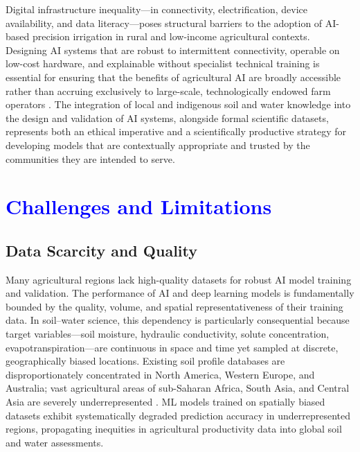 \documentclass[land,article,submit,pdftex,moreauthors]{Definitions/mdpi}
\numberwithin{equation}{section}
\begin{document}
Digital infrastructure inequality---in connectivity, electrification, device availability, and data literacy---poses structural barriers to the adoption of AI-based precision irrigation in rural and low-income agricultural contexts. Designing AI systems that are robust to intermittent connectivity, operable on low-cost hardware, and explainable without specialist technical training is essential for ensuring that the benefits of agricultural AI are broadly accessible rather than accruing exclusively to large-scale, technologically endowed farm operators \citep{shepherd2022ethics}. The integration of local and indigenous soil and water knowledge into the design and validation of AI systems, alongside formal scientific datasets, represents both an ethical imperative and a scientifically productive strategy for developing models that are contextually appropriate and trusted by the communities they are intended to serve.

\section{\textcolor{blue}{Challenges and Limitations}}

\subsection{Data Scarcity and Quality}

Many agricultural regions lack high-quality datasets for robust AI model training and validation. The performance of AI and deep learning models is fundamentally bounded by the quality, volume, and spatial representativeness of their training data. In soil--water science, this dependency is particularly consequential because target variables---soil moisture, hydraulic conductivity, solute concentration, evapotranspiration---are continuous in space and time yet sampled at discrete, geographically biased locations. Existing soil profile databases are disproportionately concentrated in North America, Western Europe, and Australia; vast agricultural areas of sub-Saharan Africa, South Asia, and Central Asia are severely underrepresented \citep{hengl2017soilgrids250m}. ML models trained on spatially biased datasets exhibit systematically degraded prediction accuracy in underrepresented regions, propagating inequities in agricultural productivity data into global soil and water assessments.
\end{document}
